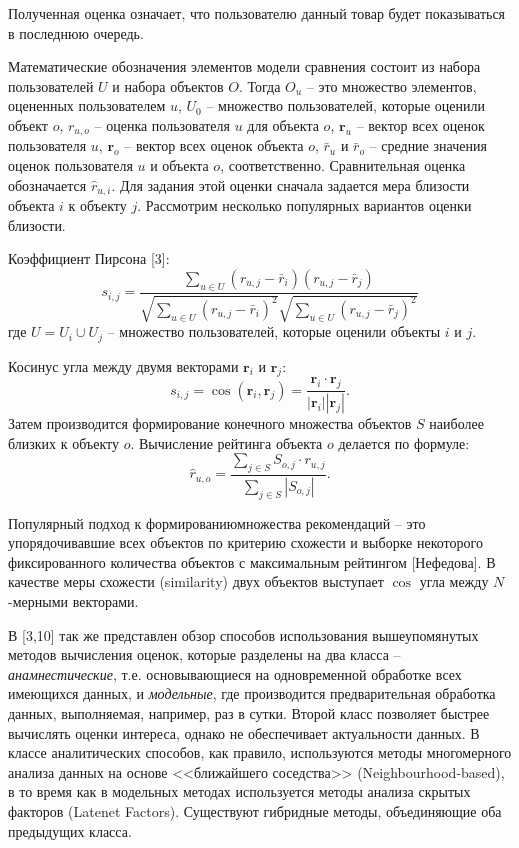 \documentclass[a4paper,14pt,openany,final]{extreport} %
\begin{document}
	Полученная оценка означает, что пользователю данный товар будет показываться в последнюю очередь.


Математические обозначения элементов модели сравнения состоит из набора пользователей $U$  и набора объектов $O$. Тогда $O_u$ -- это множество элементов, оцененных пользователем $u$, $U_0$ -- множество пользователей, которые оценили объект $o$, $r_{u,o}$ -- оценка пользователя $u$ для объекта $o$, $\mathbf{r}_u$ -- вектор всех оценок пользователя $u$, $\mathbf{r}_o$  -- вектор всех оценок объекта $o$, $\bar{r}_u$ и $\bar{r}_o$ -- средние значения оценок пользователя $u$ и объекта $o$,   соответственно. Сравнительная оценка обозначается $\hat{r}_{u,i}$. Для задания этой оценки сначала задается мера близости объекта $i$ к объекту $j$. Рассмотрим несколько популярных вариантов оценки близости.

Коэффициент Пирсона [3]:
\[
  s_{i,j}=\frac{\sum\limits_{u\in U}(r_{u,j}-\bar{r}_i)(r_{u,j}-\bar{r}_j)}{\sqrt{\sum\limits_{u\in U}(r_{u,j}-\bar{r}_i)^2}\sqrt{\sum\limits_{u\in U}(r_{u,j}-\bar{r}_j)^2}}
\]
где $U=U_i\cup U_j$ -- множество пользователей, которые оценили объекты $i$ и $j$.

Косинус угла между двумя векторами $\mathbf{r}_i$ и $\mathbf{r}_j$:
\[
  s_{i,j}=\cos(\mathbf{r}_i,\mathbf{r}_j)=\frac{\mathbf{r}_i \cdot \mathbf{r}_j}{|\mathbf{r}_i||\mathbf{r}_j|}.
\]
Затем производится формирование конечного множества объектов $S$ наиболее близких к объекту $o$. Вычисление рейтинга объекта $o$ делается по формуле:
\[
  \hat{r}_{u,o}=\frac{\sum\limits_{j\in S}S_{o,j}\cdot r_{u,j}}{\sum\limits_{j\in S}|S_{o,j}|}.
\]

Популярный подход к формированиюмножества рекомендаций -- это упорядочивавшие всех объектов по критерию схожести и выборке некоторого фиксированного количества объектов с максимальным рейтингом [Нефедова]. В качестве меры схожести (\foreignlanguage{english}{similarity}) двух объектов выступает $\cos$ угла между $N$-мерными векторами.

В [3,10] так же представлен обзор способов использования вышеупомянутых методов вычисления оценок, которые разделены на два класса -- \emph{анамнестические}, т.е. основывающиеся на одновременной обработке всех имеющихся данных, и \emph{модельные}, где производится предварительная обработка данных, выполняемая, например, раз в сутки. Второй класс позволяет быстрее вычислять оценки интереса, однако не обеспечивает актуальности данных. В классе аналитических способов, как правило, используются методы многомерного анализа данных на основе <<ближайшего соседства>> (\foreignlanguage{english}{Neighbourhood-based}), в то время как в модельных методах используется методы анализа скрытых факторов (\foreignlanguage{english}{Latenet Factors}). Существуют гибридные методы, объединяющие оба предыдущих класса.
\end{document}
